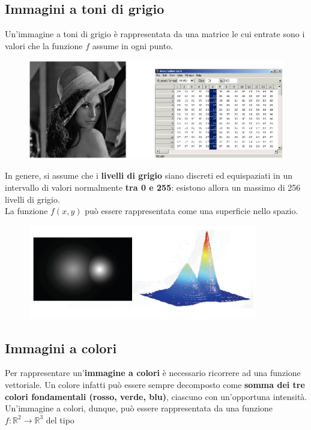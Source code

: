 \subsection{Immagini a toni di grigio}

Un'immagine a toni di grigio è rappresentata da una matrice le cui entrate sono
i valori che la funzione $f$ assume in ogni punto.

\begin{figure}[H]
    \centering
    \includegraphics[width=12cm, keepaspectratio]{capitoli/immagini/imgs/rappresentazione_immagine_toni_grigio.jpg}
\end{figure}

In genere, si assume che i \textbf{livelli di grigio} siano discreti ed
equispaziati in un intervallo di valori normalmente \textbf{tra 0 e 255}:
esistono allora un massimo di 256 livelli di grigio. \\
La funzione $f (x , y)$ può essere rappresentata come una superficie nello
spazio.

\begin{figure}[H]
    \centering
    \includegraphics[width=10cm, keepaspectratio]{capitoli/immagini/imgs/funzione_toni_grigio.jpg}
\end{figure}

\subsection{Immagini a colori}

Per rappresentare un'\textbf{immagine a colori} è necessario ricorrere ad una
funzione vettoriale. Un colore infatti può essere sempre decomposto come
\textbf{somma dei tre colori fondamentali (rosso, verde, blu)}, ciascuno con
un'opportuna intensità. Un'immagine a colori, dunque, può essere rappresentata
da una funzione $f: \mathbb{R}^2 \rightarrow \mathbb{R}^3$ del tipo

